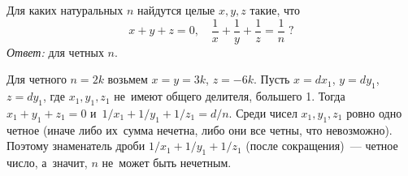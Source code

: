 \problem
Для каких натуральных $n$ найдутся целые $x, y, z$ такие, что
\[
    x + y + z = 0
,\quad
    \frac{1}{x} + \frac{1}{y} + \frac{1}{z} = \frac{1}{n}
\;?\]
\solution
\emph{Ответ:} для четных $n$.
\par
Для четного $n = 2 k$ возьмем $x = y = 3 k$, $z = - 6 k$.
Пусть $x = d x_1$, $y = d y_1$, $z = d y_1$, где $x_1, y_1, z_1$ не~имеют
общего делителя, большего 1.
Тогда $x_1 + y_1 + z_1 = 0$ и~$1 / x_1 + 1 / y_1 + 1 / z_1 = d / n$.
Среди чисел $x_1, y_1, z_1$ ровно одно четное (иначе либо их~сумма нечетна,
либо они все четны, что невозможно).
Поэтому знаменатель дроби $1 / x_1 + 1 / y_1 + 1 / z_1$ (после сокращения)~---
четное число, а~значит, $n$ не~может быть нечетным.
\endproblem

